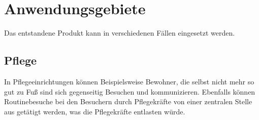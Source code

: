 \chapter{Anwendungsgebiete}
Das entstandene Produkt kann in verschiedenen Fällen eingesetzt werden. 
\section{Pflege}
In Pflegeeinrichtungen können Beispielsweise Bewohner, die selbst nicht mehr so gut zu Fuß sind sich gegenseitig Besuchen und kommunizieren. Ebenfalls können Routinebesuche bei den Besuchern durch Pflegekräfte von einer zentralen Stelle aus getätigt werden, was die Pflegekräfte entlasten würde. 
